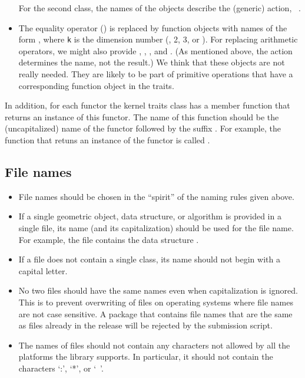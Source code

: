 \begin{itemize}
      For the second class, the names of the objects describe the (generic)
      action, \eg~.
\item The equality operator () is replaced by function
      objects with names of the form , where {\tt k} is
      the dimension number (\ie, 2, 3, or ).
      For replacing arithmetic operators, we might also provide ,
      , , and . (As mentioned
      above, the action determines the name, not the result.) We think
      that these objects are not really needed.  They are likely to be
      part of primitive operations that have a corresponding function
      object in the traits.
\end{itemize}

In addition, for each functor the kernel traits class has a member
function that returns an instance of this functor.  The name of this
function should be the (uncapitalized) name of the
functor followed by the suffix .%
For example, the function that retuns an instance of the
 functor is called .

\subsection*{File names}

\begin{itemize}
\item File names should be chosen in the ``spirit'' of the naming rules given
      above.
\item If a single geometric object, data structure, or algorithm is provided
      in a single file, its name (and its capitalization) should be used for
      the file name. For
      example, the file  contains the data structure
      .
\item If a file does not contain a single class, its name should not begin
      with a capital letter.
\item No two files should have the same names even when capitalization is
      ignored.  This is to prevent overwriting of files on operating systems
      where file names are not case sensitive.  A package that contains
      file names that are the same as files already in the release will be
      rejected by the submission script.

\item The names of files should not contain any characters not allowed by
      all the platforms the library supports.  In particular, it should not
      contain the characters `:', `*', or `\ '.
\end{itemize}


